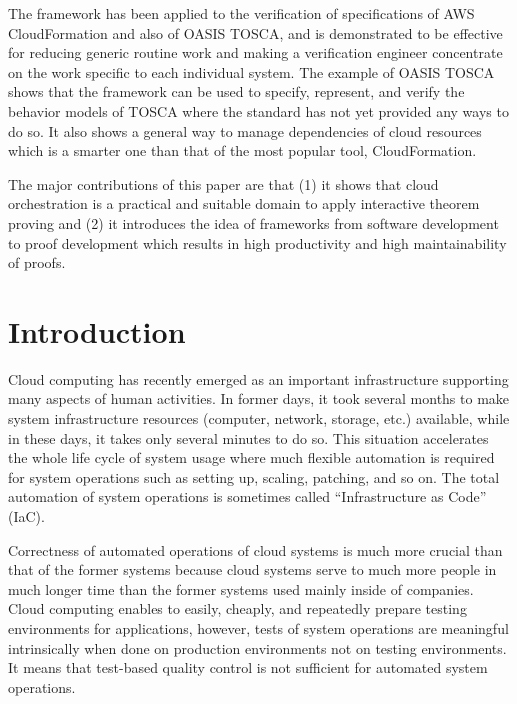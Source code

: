 \documentclass[12pt]{report}
\begin{document}
The framework has been applied to the verification of specifications
of AWS CloudFormation and also of OASIS TOSCA, and is demonstrated to
be effective for reducing generic routine work and making a
verification engineer concentrate on the work specific to each
individual system. The example of OASIS TOSCA shows that the framework
can be used to specify, represent, and verify the behavior models of
TOSCA where the standard has not yet provided any ways to do so. It
also shows a general way to manage dependencies of cloud resources
which is a smarter one than that of the most popular tool,
CloudFormation.

The major contributions of this paper are that (1) it shows that cloud
orchestration is a practical and suitable domain to apply interactive
theorem proving and (2) it introduces the idea of frameworks from
software development to proof development which results in high
productivity and high maintainability of proofs.


\tableofcontents
\listoffigures
\newpage
{}
\setcounter{page}{1}

\chapter{Introduction}
Cloud computing has recently emerged as an important infrastructure
supporting many aspects of human activities. In former days, it took
several months to make system infrastructure resources (computer,
network, storage, etc.) available, while in these days, it takes only
several minutes to do so. This situation accelerates the whole life
cycle of system usage where much flexible automation is required for
system operations such as setting up, scaling, patching, and so on.
The total automation of system operations is sometimes called
``Infrastructure as Code'' (IaC).

Correctness of automated operations of cloud systems is much more
crucial than that of the former systems because cloud systems serve to
much more people in much longer time than the former systems used
mainly inside of companies. Cloud computing enables to easily,
cheaply, and repeatedly prepare testing environments for applications,
however, tests of system operations are meaningful intrinsically when
done on production environments not on testing environments.  It means
that test-based quality control is not sufficient for automated
system operations.
\end{document}
